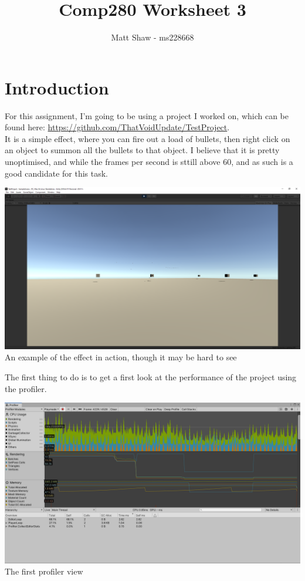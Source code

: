 \documentclass{article}
\title{Comp280 Worksheet 3}
\author{Matt Shaw - ms228668}
\begin{document}
\maketitle

\section{Introduction}
For this assignment, I'm going to be using a project I worked on, which can be found here: \url{https://github.com/ThatVoidUpdate/TestProject}. \\
It is a simple effect, where you can fire out a load of bullets, then right click on an object to summon all the bullets to that object. I believe that it is pretty unoptimised, and while the frames per second is sttill above 60, and as such is a good candidate for this task.
\begin{center}
    \includegraphics[width=\textwidth]{Images/Example.png}\\
    An example of the effect in action, though it may be hard to see\\
\end{center}
The first thing to do is to get a first look at the performance of the project using the profiler.
\begin{center}
    \includegraphics[width=\textwidth]{Images/FirstProfile.png}
    The first profiler view
\end{center}
\end{document}
